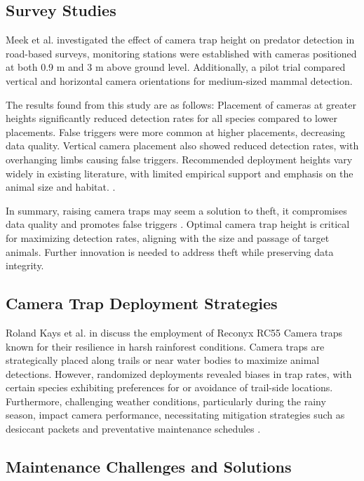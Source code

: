 \documentclass[class=report,11pt,crop=false]{standalone}
\begin{document}
\subsection{Survey Studies}

Meek et al. \cite{meek2016higher} investigated the effect of camera trap height on predator detection in road-based surveys, monitoring stations were established with cameras positioned at both 0.9 m and 3 m above ground level. Additionally, a pilot trial compared vertical and horizontal camera orientations for medium-sized mammal detection. 

The results found from this study are as follows: Placement of cameras at greater heights significantly reduced detection rates for all species compared to lower placements. False triggers were more common at higher placements, decreasing data quality. Vertical camera placement also showed reduced detection rates, with overhanging limbs causing false triggers. Recommended deployment heights vary widely in existing literature, with limited empirical support and emphasis on the animal size and habitat. \cite{meek2016higher}. 

In summary, raising camera traps may seem a solution to theft, it compromises data quality and promotes false triggers \cite{meek2016higher}. Optimal camera trap height is critical for maximizing detection rates, aligning with the size and passage of target animals. Further innovation is needed to address theft while preserving data integrity. 

 

\subsection{Camera Trap Deployment Strategies}

Roland Kays et al. in \cite{kays2009camera} discuss the employment of Reconyx RC55 Camera traps known for their resilience in harsh rainforest conditions. Camera traps are strategically placed along trails or near water bodies to maximize animal detections. However, randomized deployments revealed biases in trap rates, with certain species exhibiting preferences for or avoidance of trail-side locations. Furthermore, challenging weather conditions, particularly during the rainy season, impact camera performance, necessitating mitigation strategies such as desiccant packets and preventative maintenance schedules \cite{kays2009camera}.

 

\subsection{Maintenance Challenges and Solutions}
\end{document}
